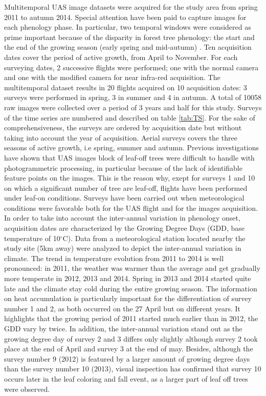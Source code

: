 \documentclass[remotesensing,article,submit,moreauthors,pdftex,12pt,a4paper]{mdpi} %
\begin{document}
Multitemporal UAS image datasets were acquired for the study area from spring 2011 to autumn 2014. 
Special attention have been paid to capture images for each phenology phase. 
In particular, two temporal windows were considered as prime important because of the disparity in forest tree phenology: the start and the end of the growing season (early spring and mid-autumn) \cite{hill_mapping_2010, key_comparison_2001}. 
Ten acquisition dates cover the period of active growth, from April to November. 
For each surveying dates, 2 successive flights were performed; one with the normal camera and one with the modified camera for near infra-red acquisition. The multitemporal dataset results in 20 flights acquired on 10 acquisition dates: 3 surveys were performed in spring, 3 in summer and 4 in autumn. 
A total of 10058 raw images were collected over a period of 3 years and half for this study. 
Surveys of the time series are numbered and described on table \ref{tab:TS}.
For the sake of comprehensiveness, the surveys are ordered by acquisition date but without taking into account the year of acquisition. 
Aerial surveys covers the three seasons of active growth, i.e spring, summer and autumn. Previous investigations have shown that UAS images block of leaf-off trees were difficult to handle with photogrammetric processing, in particular because of the lack of identifiable feature points on the images. 
This is the reason why, exept for surveys 1 and 10 on which a significant number of tree are leaf-off, flights have been performed under leaf-on conditions. 
Surveys have been carried out when meteorological conditions were favorable both for the UAS flight and for the images acquisition. %
In order to take into account the inter-annual variation in phenology onset, acquisition dates are characterized by the Growing Degree Days (GDD, base temperature of 10$^{\circ}$C). 
Data from a meteorological station located nearby the study site (5km away) were analyzed to depict the inter-annual variation in climate. 
The trend in temperature evolution from 2011 to 2014 is well pronounced: in 2011, the weather was warmer than the average and get gradually more temperate in 2012, 2013 and 2014. Spring in 2013 and 2014 started quite late and the climate stay cold during the entire growing season. 
The information on heat accumulation is particularly important for the differentiation of survey number 1 and 2, as both occurred on the 27 April but on different years. 
It highlights that the growing period of 2011 started much earlier than in 2012, the GDD vary by twice. 
In addition, the inter-annual variation stand out as the growing degree day of survey 2 and 3 differs only slightly although survey 2 took place at the end of April and survey 3 at the end of may. 
Besides, although the survey number 9 (2012) is featured by a larger amount of growing degree days than the survey number 10 (2013), visual inspection has confirmed that survey 10 occurs later in the leaf coloring and fall event, as a larger part of leaf off trees were observed.
\end{document}
